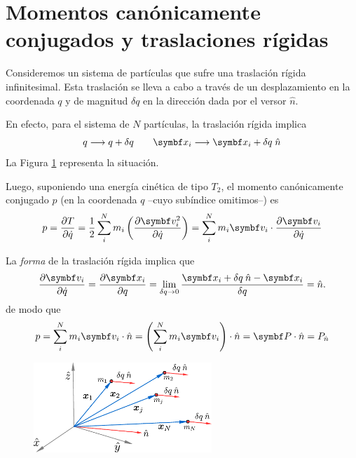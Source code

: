 \documentclass[10pt,oneside]{CBFT_book}
\begin{document}
\section{Momentos canónicamente conjugados y traslaciones rígidas}

Consideremos un sistema de partículas que sufre una traslación rígida infinitesimal.
Esta traslación se lleva a cabo a través de un desplazamiento en la coordenada $ q $ y de magnitud 
$\delta q$ en la dirección dada por el versor $ \hat{n} $.

En efecto, para el sistema de $ N $ partículas, la traslación rígida implica
\[
	q \longrightarrow q + \delta q \qquad 
	\vb{x}_i \longrightarrow \vb{x}_i + \delta q \; \hat{n}
\]
La Figura \ref{traslacion_rigida} representa la situación.

Luego, suponiendo una energía cinética de tipo $T_2$, el momento canónicamente conjugado $ p $ (en 
la coordenada $q$ --cuyo subíndice omitimos--) es
\[
	p = \dpar{T}{\dot{q}} = \frac{1}{2} \sum_i^N m_i \left( \dpar{\vb{v}_i^2}{\dot{q}}\right) =
	\sum_i^N m_i \vb{v}_i \cdot \dpar{\vb{v}_i}{\dot{q}} 
\]

La {\it forma} de la traslación rígida implica que 
\[
	\dpar{\vb{v}_i}{\dot{q}} = \dpar{\vb{x}_i}{q} = 
	\lim_{\delta q \to 0} \frac{\vb{x}_i + \delta q \:\hat{n} -\vb{x}_i}{\delta q} = \hat{n}.
\]
de modo que 
\[
	p = \sum_i^N m_i \vb{v}_i \cdot \hat{n} = \left( \sum_i^N m_i \vb{v}_i \right) \cdot \hat{n} 
	= \vb{P} \cdot \hat{n} = P_{\hat{n}}
\]

\begin{figure}[htb]
	\begin{center}
	\includegraphics[width=0.6\textwidth]{images/fig_mc_tras_rig.pdf}	 
	\end{center}
	\caption{}
	\label{traslacion_rigida}
\end{figure} 
\end{document}
